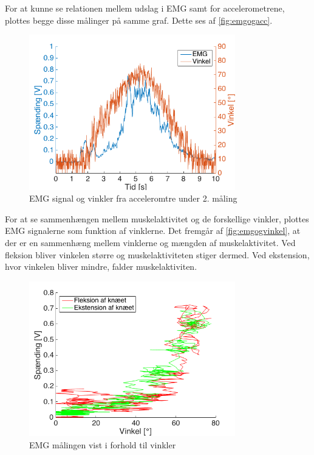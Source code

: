 For at kunne se relationen mellem udslag i EMG samt for accelerometrene, plottes begge disse målinger på samme graf. Dette ses af \autoref{fig:emgogacc}. 
\begin{figure}[H]
	\centering
	\includegraphics[width=0.8\textwidth]{figures/Pilotforsoeg/emg_vinkler_tid}
	\caption{EMG signal og vinkler fra acceleromtre under 2. måling}
	\label{fig:emgogacc}
\end{figure}


For at se sammenhængen mellem muskelaktivitet og de forskellige vinkler, plottes EMG signalerne som funktion af vinklerne. Det fremgår af \autoref{fig:emgogvinkel}, at der er en sammenhæng mellem vinklerne og mængden af muskelaktivitet. Ved fleksion bliver vinkelen større og muskelaktiviteten stiger dermed. Ved ekstension, hvor vinkelen bliver mindre, falder muskelaktiviten.





\begin{figure}[H]
	\centering
	\includegraphics[width=0.8\textwidth]{figures/Pilotforsoeg/emg_vinkler}
	\caption{EMG målingen vist i forhold til vinkler}
	\label{fig:emgogvinkel}
\end{figure}




